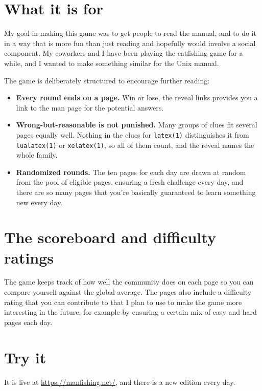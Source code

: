 \documentclass{article}
\begin{document}
\section{What it is for}

My goal in making this game was to get people to read the manual, and to do it in a
way that is more fun than just reading and hopefully would involve a social component.
My coworkers and I have been playing the catfishing game\cite{catfishing} for a while,
and I wanted to make something similar for the Unix manual.

The game is deliberately structured to encourage further reading:

\begin{itemize}
  \item \textbf{Every round ends on a page.} Win or lose, the reveal links
  provides you a link to the man page for the potential answers.

  \item \textbf{Wrong-but-reasonable is not punished.} Many groups of clues fit
  several pages equally well. Nothing in the clues for \verb|latex(1)|
  distinguishes it from \verb|lualatex(1)| or \verb|xelatex(1)|, so all of them
  count, and the reveal names the whole family.

  \item \textbf{Randomized rounds.} The ten pages for each day are drawn at random from
  the pool of eligible pages, ensuring a fresh challenge every day, and there are so
  many pages that you're basically guaranteed to learn something new every day.
\end{itemize}

\section{The scoreboard and difficulty ratings}

The game keeps track of how well the community does on each page so you can compare
yourself against the global average. The pages also include a difficulty rating that you
can contribute to that I plan to use to make the game more interesting in the future, 
for example by ensuring a certain mix of easy and hard pages each day.

\section{Try it}

It is live at \url{https://manfishing.net/}\cite{manfishing}, and there is a new
edition every day.
\end{document}
